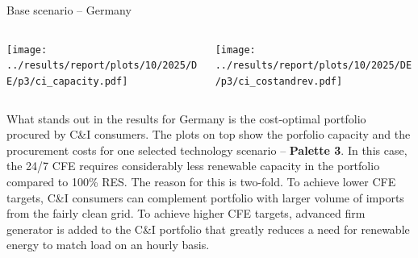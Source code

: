 \begin{frame}{Base scenario -- Germany}

    {\footnotesize
  
    \begin{columns}
    \begin{column}{7cm}
    \centering
    \texttt{[image: ../results/report/plots/10/2025/DE/p3/ci\_capacity.pdf]}
    \end{column}
  
    \begin{column}{8cm}
    \centering
    \texttt{[image: ../results/report/plots/10/2025/DE/p3/ci\_costandrev.pdf]}
    \end{column}
  
    \end{columns}
  
    \begin{columns}
    \begin{column}{15cm}
     
    What stands out in the results for Germany is the cost-optimal 
    portfolio procured by C\&I consumers. 
    The plots on top show the porfolio capacity and the procurement 
    costs for one selected technology scenario -- {\bf Palette 3}.
    In this case, the 24/7 CFE requires
    \alert{considerably less renewable capacity} in the portfolio 
    compared to 100\% RES. The reason for this is two-fold. 
    To achieve lower CFE targets, C\&I consumers can complement portfolio with larger volume of 
    imports from the fairly clean grid. 
    To achieve higher CFE targets, \alert{advanced firm generator}
    is added to the C\&I portfolio that greatly reduces a need 
    for renewable energy to match load on an hourly basis.
    \end{column}
    \end{columns}
    }
  
  \end{frame}



